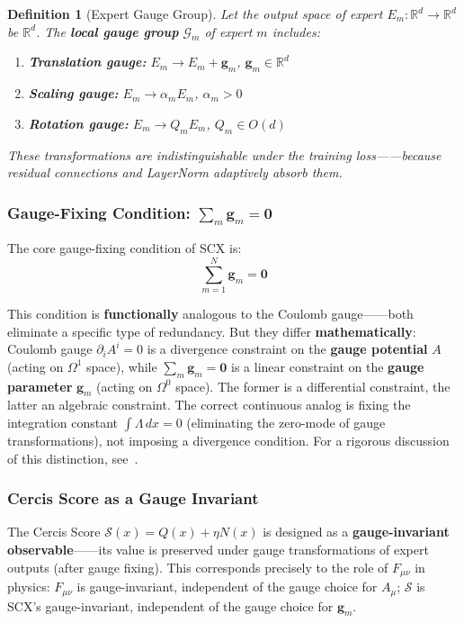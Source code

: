 \documentclass[12pt,a4paper]{article}
\newtheorem{definition}[theorem]{Definition}
\theoremstyle{remark}
\newcommand{\R}{\mathbb{R}}
\newcommand{\CercisScore}{\mathcal{S}}
\newcommand{\gaugeparam}{\mathbf{g}}
\newcommand{\calG}{\mathcal{G}}
\begin{document}
\begin{definition}[Expert Gauge Group]
Let the output space of expert $E_m: \R^d \to \R^d$ be $\R^d$. The \textbf{local gauge group} $\calG_m$ of expert $m$ includes:
\begin{enumerate}[label=(\roman*)]
    \item \textbf{Translation gauge:} $E_m \to E_m + \gaugeparam_m$, $\gaugeparam_m \in \R^d$
    \item \textbf{Scaling gauge:} $E_m \to \alpha_m E_m$, $\alpha_m > 0$
    \item \textbf{Rotation gauge:} $E_m \to Q_m E_m$, $Q_m \in O(d)$
\end{enumerate}
These transformations are indistinguishable under the training loss——because residual connections and LayerNorm adaptively absorb them.
\end{definition}

\subsubsection{Gauge-Fixing Condition: $\sum_m \gaugeparam_m = \mathbf{0}$}

The core gauge-fixing condition of SCX is:
\begin{equation}
    \boxed{\sum_{m=1}^{N} \gaugeparam_m = \mathbf{0}}
    \label{eq:scx_gauge_fix}
\end{equation}

This condition is \textbf{functionally} analogous to the Coulomb gauge——both eliminate
a specific type of redundancy. But they differ \textbf{mathematically}: Coulomb gauge $\partial_i A^i = 0$ is a divergence constraint on the \textbf{gauge potential} $A$
(acting on $\Omega^1$ space), while $\sum_m \gaugeparam_m = \mathbf{0}$ is a linear constraint on the \textbf{gauge parameter} $\gaugeparam_m$
(acting on $\Omega^0$ space). The former is a differential constraint, the latter an algebraic constraint.
The correct continuous analog is fixing the integration constant $\int \Lambda\,dx = 0$ (eliminating the zero-mode of gauge
transformations), not imposing a divergence condition. For a rigorous discussion
of this distinction, see~\cite{scx_fiber_bundle}.

\subsubsection{Cercis Score as a Gauge Invariant}

The Cercis Score $\CercisScore(x) = Q(x) + \eta N(x)$ is designed as a
\textbf{gauge-invariant observable}——its value is preserved under gauge transformations of
expert outputs (after gauge fixing). This corresponds precisely to the role of
$F_{\mu\nu}$ in physics: $F_{\mu\nu}$ is gauge-invariant, independent of the
gauge choice for $A_\mu$; $\CercisScore$ is SCX's gauge-invariant, independent
of the gauge choice for $\gaugeparam_m$.
\end{document}
